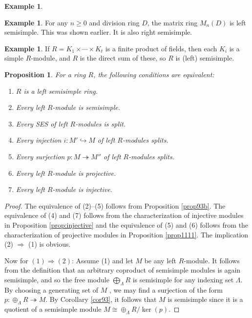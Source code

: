 \documentclass{amsart}[12pt]
\def\ker{\operatorname{ker}}
\newcommand{\onto}{\twoheadrightarrow}
\numberwithin{equation}{section}
\theoremstyle{plain} %
\newtheorem{prop}[equation]{Proposition}
\theoremstyle{definition}
\newtheorem{ex}[equation]{Example}
\theoremstyle{remark}
\begin{document}
\begin{ex}
\begin{ex} For any $n \geq 0$ and division ring $D$, the matrix ring $M_n(D)$ is left semisimple.  This was shown earlier. It is also right semisimple. \end{ex}

\begin{ex} If $R=K_1 \times \cdots \times K_t$ is a finite product of fields, then each $K_i$ is a simple $R$-module, and $R$ is the direct sum of these, so $R$ is (left) semisimple.
\end{ex}



  \begin{prop} \label{prop916} For a ring $R$, the following conditions are equivalent:
    \begin{enumerate}
    \item $R$ is a left semisimple ring.
      \item Every left $R$-module is semisimple.
      \item Every SES of left $R$-modules is split.
      \item Every injection $i: M' \hookrightarrow M$ of left $R$-modules splits.
      \item Every surjection $p: M \onto M''$ of left $R$-modules splits.        
          \item Every left $R$-module is projective.
      \item Every left $R$-module is injective.
      \end{enumerate}
\end{prop}



    \begin{proof} The equivalence of (2)--(5) follows from Proposition \ref{prop93b}. The equivalence of (4) and (7) follows from the characterization of injective modules in Proposition \ref{prop:injective} and the equivalence of (5) and (6) follows from the characterization of projective modules in Proposition \ref{prop1111}.
        The implication (2) $\Rightarrow$ (1) is obvious.

        Now for $(1)\Rightarrow (2)$: Assume (1) and let $M$ be any left $R$-module.
        It follows from the definition that an arbitrary coproduct of semisimple modules is again semisimple, and so the free module $\bigoplus_\Lambda R$ is semisimple for any indexing set $\Lambda$. By choosing a generating set of $M$ , we may find a surjection of the form $p: \oplus_\Lambda R \onto M$. By Corollary \ref{cor93},
        it follows that $M$ is semisimple since it is a quotient of a semisimple module $M\cong \oplus_\Lambda R/\ker(p)$.
      \end{proof}


\end{ex}
\end{document}
